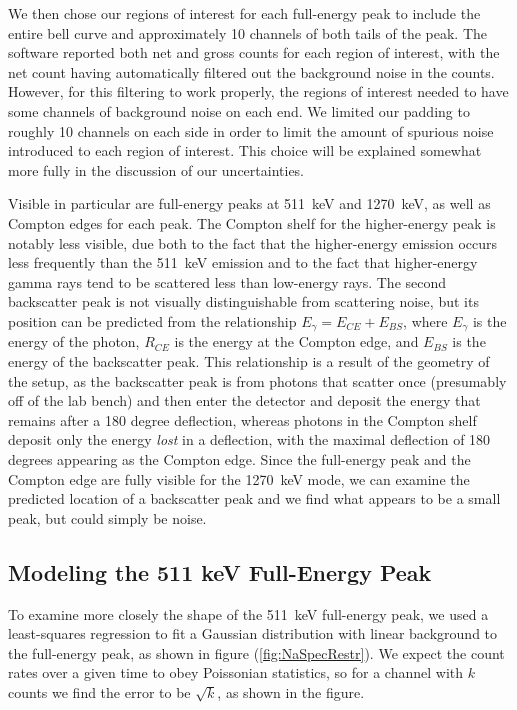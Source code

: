 \documentclass[letter]{article}
\begin{document}
We then chose our regions of interest for each full-energy peak to include the entire bell curve and approximately 10 channels of both tails of the peak. The software reported both net and gross counts for each region of interest, with the net count having automatically filtered out the background noise in the counts. However, for this filtering to work properly, the regions of interest needed to have some channels of background noise on each end. We limited our padding to roughly 10 channels on each side in order to limit the amount of spurious noise introduced to each region of interest. This choice will be explained somewhat more fully in the discussion of our uncertainties.

 Visible in particular are full-energy peaks at \qty{511}{\kilo\electronvolt} and \qty{1270}{\kilo\electronvolt}, as well as Compton edges for each peak. The Compton shelf for the higher-energy peak is notably less visible, due both to the fact that the higher-energy emission occurs less frequently than the \qty{511}{\kilo\electronvolt} emission and to the fact that higher-energy gamma rays tend to be scattered less than low-energy rays. The second backscatter peak is not visually distinguishable from scattering noise, but its position can be predicted from the relationship ${E_\gamma = E_{CE} + E_{BS}}$, where $E_\gamma$ is the energy of the photon, $R_{CE}$ is the energy at the Compton edge, and $E_{BS}$ is the energy of the backscatter peak. This relationship is a result of the geometry of the setup, as the backscatter peak is from photons that scatter once (presumably off of the lab bench) and then enter the detector and deposit the energy that remains after a 180 degree deflection, whereas photons in the Compton shelf deposit only the energy \textit{lost} in a deflection, with the maximal deflection of 180 degrees appearing as the Compton edge. Since the full-energy peak and the Compton edge are fully visible for the \qty{1270}{\kilo\electronvolt} mode, we can examine the predicted location of a backscatter peak and we find what appears to be a small peak, but could simply be noise. 

\subsection{Modeling the 511 keV Full-Energy Peak}

To examine more closely the shape of the \qty{511}{\kilo\electronvolt} full-energy peak, we used a least-squares regression to fit a Gaussian distribution with linear background to the full-energy peak, as shown in figure (\ref{fig:NaSpecRestr}). We expect the count rates over a given time to obey Poissonian statistics, so for a channel with $k$ counts we find the error to be $\sqrt{k}$, as shown in the figure.
\end{document}

